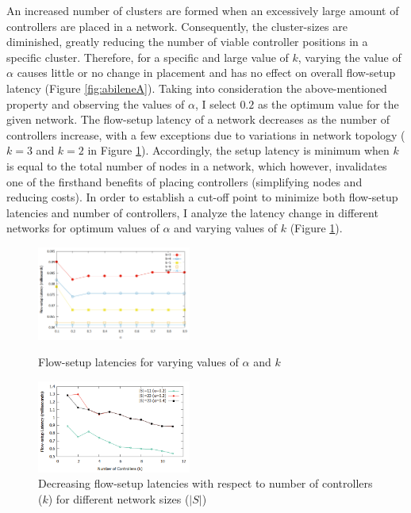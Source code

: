 \documentclass{IEEEtran}
\begin{document}
	An increased number of clusters are formed when an excessively large amount of controllers are placed in a network. Consequently, the cluster-sizes are diminished, greatly reducing the number of viable controller positions in a specific cluster. Therefore, for a specific and large value of $k$, varying the value of $\alpha$ causes little or no change in placement and has no effect on overall flow-setup latency (Figure \ref{fig:abileneA}). Taking into consideration the above-mentioned property and observing the values of $\alpha$, I select $0.2$ as the optimum value for the given network. The flow-setup latency of a network decreases as the number of controllers increase, with a few exceptions due to variations in network topology ($k=3$ and $k=2$ in Figure \ref{fig:KvsL}). Accordingly, the setup latency is minimum when $k$ is equal to the total number of nodes in a network, which however, invalidates one of the firsthand benefits of placing controllers (simplifying nodes and reducing costs). In order to establish a cut-off point to minimize both flow-setup latencies and number of controllers, I analyze the latency change in different networks for optimum values of $\alpha$ and varying values of $k$ (Figure \ref{fig:KvsL}).
	
	\begin{figure}
		\centering
		\includegraphics[width=0.45\textwidth]{Images/Abilene_Analysis.png}
		\caption{Flow-setup latencies for varying values of $\alpha$ and $k$} \label{fig:abileneA}
		
		\centering
		\includegraphics[width=0.45\textwidth]{Images/k_vs_l.png}
		\caption{Decreasing flow-setup latencies with respect to number of controllers ($k$) for different network sizes ($|S|$)} \label{fig:KvsL}
	\end{figure}
\end{document}
